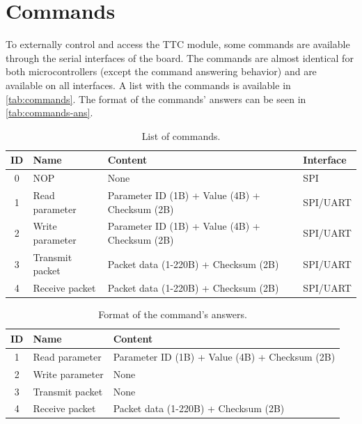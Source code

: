 \section{Commands} \label{sec:commands}

To externally control and access the TTC module, some commands are available through the serial interfaces of the board. The commands are almost identical for both microcontrollers (except the command answering behavior) and are available on all interfaces. A list with the commands is available in \autoref{tab:commands}. The format of the commands' answers can be seen in \autoref{tab:commands-ans}.

\begin{table}[!ht]
    \centering
    \begin{tabular}{clll}
        \toprule[1.5pt]
        \textbf{ID} & \textbf{Name} & \textbf{Content} & \textbf{Interface}\\
        \midrule
        0   & NOP               & None                                           & SPI \\
        1   & Read parameter    & Parameter ID (1B) + Value (4B) + Checksum (2B) & SPI/UART \\
        2   & Write parameter   & Parameter ID (1B) + Value (4B) + Checksum (2B) & SPI/UART \\
        3   & Transmit packet   & Packet data (1-220B) + Checksum (2B)           & SPI/UART \\
        4   & Receive packet    & Packet data (1-220B) + Checksum (2B)           & SPI/UART \\
        \bottomrule[1.5pt]
    \end{tabular}
    \caption{List of commands.}
    \label{tab:commands}
\end{table}

\begin{table}[!ht]
    \centering
    \begin{tabular}{cll}
        \toprule[1.5pt]
        \textbf{ID} & \textbf{Name} & \textbf{Content}\\
        \midrule
        1   & Read parameter    & Parameter ID (1B) + Value (4B) + Checksum (2B) \\
        2   & Write parameter   & None \\
        3   & Transmit packet   & None \\
        4   & Receive packet    & Packet data (1-220B) + Checksum (2B) \\
        \bottomrule[1.5pt]
    \end{tabular}
    \caption{Format of the command's answers.}
    \label{tab:commands-ans}
\end{table}

